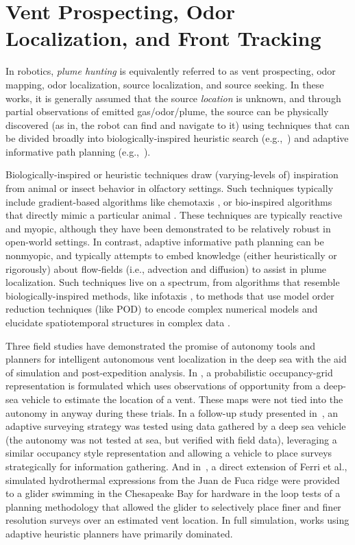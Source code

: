 \section{Vent Prospecting, Odor Localization, and Front Tracking}
\label{sec:rw_planning}
In robotics, \emph{plume hunting} is equivalently referred to as vent prospecting, odor mapping, odor localization, source localization, and source seeking. In these works, it is generally assumed that the source \emph{location} is unknown, and through partial observations of emitted gas/odor/plume, the source can be physically discovered (as in, the robot can find and navigate to it) using techniques that can be divided broadly into biologically-inspired heuristic search (e.g.,~\cite{reddy2022olfactory,chen2019odor}) and adaptive informative path planning (e.g.,~\cite{salam2019adaptive, jakuba2007stochastic}).

Biologically-inspired or heuristic techniques draw (varying-levels of) inspiration from animal or insect behavior in olfactory settings. Such techniques typically include gradient-based algorithms like chemotaxis \autocite{morse1998robust}, or bio-inspired algorithms that directly mimic a particular animal \autocite{edwards2001representing,grasso2000biomimetic}. These techniques are typically reactive and myopic, although they have been demonstrated to be relatively robust in open-world settings. In contrast, adaptive informative path planning can be nonmyopic, and typically attempts to embed knowledge (either heuristically or rigorously) about flow-fields (i.e., advection and diffusion) to assist in plume localization. Such techniques live on a spectrum, from algorithms that resemble biologically-inspired methods, like infotaxis \autocite{vergassola2007infotaxis}, to methods that use model order reduction techniques (like POD) to encode complex numerical models and elucidate spatiotemporal structures in complex data \autocite{peng2014dynamic,salam2019adaptive}. 

Three field studies have demonstrated the promise of autonomy tools and planners for intelligent autonomous vent localization in the deep sea with the aid of simulation and post-expedition analysis. In \cite{jakuba2007stochastic}, a probabilistic occupancy-grid representation is formulated which uses observations of opportunity from a deep-sea vehicle to estimate the location of a vent. These maps were not tied into the autonomy in anyway during these trials. In a follow-up study presented in~\cite{ferri2010novel}, an adaptive surveying strategy was tested using data gathered by a deep sea vehicle (the autonomy was not tested at sea, but verified with field data), leveraging a similar occupancy style representation and allowing a vehicle to place surveys strategically for information gathering. And in~\cite{branch2020demonstration}, a direct extension of Ferri et al., simulated hydrothermal expressions from the Juan de Fuca ridge were provided to a glider swimming in the Chesapeake Bay for hardware in the loop tests of a planning methodology that allowed the glider to selectively place finer and finer resolution surveys over an estimated vent location. In full simulation, works using adaptive heuristic planners \autocite{wang20203,pang2010plume} have primarily dominated.

